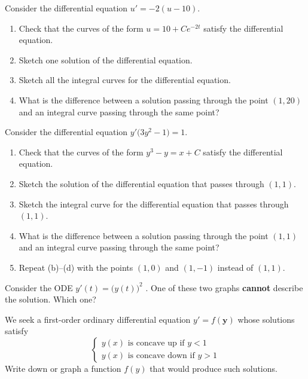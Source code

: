 \begin{exercises}
\begin{problist}
	\prob Consider the differential equation $u' = -2(u-10)$.
	
	\begin{enumerate}
		\item Check that the curves of the form $u = 10 + C e^{-2t}$ satisfy the differential equation.
		\item Sketch one solution of the differential equation.
		\item Sketch all the integral curves for the differential equation.
		\item What is the difference between a solution passing through the point $(1,20)$ and an integral curve passing through the same point?
	\end{enumerate}


	\prob Consider the differential equation $y'\big( 3y^2-1\big) = 1$.
	
	\begin{enumerate}
		\item Check that the curves of the form $y^3-y=x+C$ satisfy the differential equation.
		\item Sketch the solution of the differential equation that passes through $(1,1)$.
		\item Sketch the integral curve for the differential equation that passes through $(1,1)$.
		\item What is the difference between a solution passing through the point $(1,1)$ and an integral curve passing through the same point?
		\item Repeat (b)--(d) with the points $(1,0)$ and $(1,-1)$ instead of $(1,1)$.
	\end{enumerate}


	\prob Consider the ODE \quad $y'(t) = \big(y(t)\big)^2$ \quad .
	One of these two graphs {\bf cannot} describe the solution. 
	Which one? 
	
	
	\begin{center}
	\hfil
	\end{center}

	\prob We seek a first-order ordinary differential equation \quad $y' = f(\pmb{y})$ \quad whose solutions satisfy
	$$
	\begin{cases}
	y(x)  \mbox{ is concave up if } y < 1 \\
	y(x) \mbox{ is concave down if } y > 1
	\end{cases}
	$$
	Write down or graph a function $f(y)$ that would produce such solutions.

	
	\end{problist}
\end{exercises}
